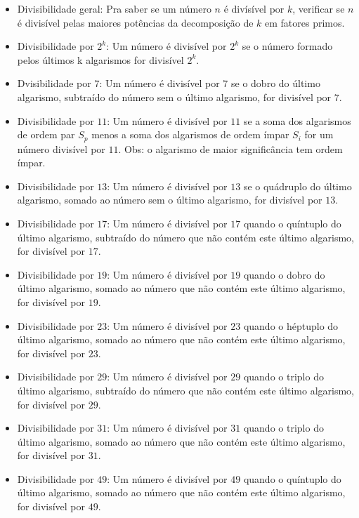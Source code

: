 \documentclass[12pt]{article}
\begin{document}
\begin{itemize}
\item Divisibilidade geral: Pra saber se um número $n$ é divísível por $k$, verificar se $n$ é divisível pelas maiores potências da decomposição de $k$ em fatores primos.

\item Divisibilidade por $2^k$: Um número é divisível por $2^k$ se o número formado pelos últimos k algarismos for divisível $2^k$.

\item Dvisibilidade por $7$: Um número é divisível por $7$ se o dobro do último algarismo, subtraído do número sem o último algarismo, for divisível por $7$. 

\item Divisibilidade por $11$: Um número é divisível por $11$ se a soma dos algarismos de ordem par $S_p$ menos a soma dos algarismos de ordem ímpar $S_i$ for um número divisível por $11$. Obs: o algarismo de maior significância tem ordem ímpar.

\item Divisibilidade por $13$: Um número é divisível por $13$ se o quádruplo do último algarismo, somado ao número sem o último algarismo, for divisível por $13$.

\item Divisibilidade por $17$: Um número é divisível por $17$ quando o quíntuplo do último algarismo, subtraído do número que não contém este último algarismo, for divisível por $17$.

\item Divisibilidade por $19$: Um número é divisível por $19$ quando o dobro do último algarismo, somado ao número que não contém este último algarismo, for divisível por $19$.

\item Divisibilidade por $23$: Um número é divisível por $23$ quando o héptuplo do último algarismo, somado ao número que não contém este último algarismo, for divisível por $23$.

\item Divisibilidade por $29$: Um número é divisível por $29$ quando o triplo do último algarismo, subtraído do número que não contém este último algarismo, for divisível por $29$.

\item Divisibilidade por $31$: Um número é divisível por $31$ quando o triplo do último algarismo, somado ao número que não contém este último algarismo, for divisível por $31$.

\item Divisibilidade por $49$: Um número é divisível por $49$ quando o quíntuplo do último algarismo, somado ao número que não contém este último algarismo, for divisível por $49$.
\end{itemize}
\end{document}
